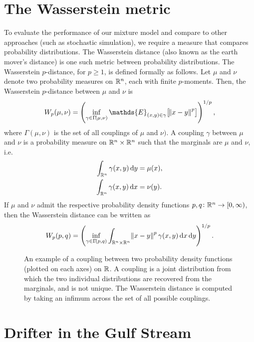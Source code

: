 \section{The Wasserstein metric}
To evaluate the performance of our mixture model and compare to other approaches (such as stochastic simulation), we require a measure that compares probability distributions.
The Wasserstein distance (also known as the earth mover's distance) is one such metric between probability distributions.
The Wasserstein \(p\)-distance, for \(p \geq 1\), is defined formally as follows.
Let \(\mu\) and \(\nu\) denote two probability measures on \(\mathbb{R}^n\), each with finite \(p\)-moments.
Then, the Wasserstein \(p\)-distance between \(\mu\) and \(\nu\) is
\[
	W_p\!\left(\mu, \nu\right) = \left(\inf_{\gamma \in \Gamma\!\left(\mu, \nu\right)}\mathds{E}_{(x,y) \in \gamma}\!\left[\norm{x - y}^p\right]\right)^{1/p},
\]
where \(\Gamma\!(\mu, \nu)\) is the set of all couplings of \(\mu\) and \(\nu)\).
A coupling \(\gamma\) between \(\mu\) and \(\nu\) is a probability measure on \(\mathbb{R}^n \times \mathbb{R}^n\) such that the marginals are \(\mu\) and \(\nu\), i.e.
\begin{align*}
	\int_{\R^n}{\gamma(x,y)\dif y} & = \mu(x), \\
	\int_{\R^n}{\gamma(x,y)\dif x} & = \nu(y).
\end{align*}
If \(\mu\) and \(\nu\) admit the respective probability density functions \(p, q \colon \mathbb{R}^n \to [0,\infty)\), then the Wasserstein distance can be written as
\[
	W_p\!\left(p, q\right) = \left(\inf_{\gamma \in \Gamma\!\left(p,q\right)}\int_{\R^n \times \R^n}{\norm{x - y}^p \gamma\!\left(x,y\right)\dif x\dif y}\right)^{1/p}.
\]



\begin{figure}
	\begin{center}
		\caption{An example of a coupling between two probability density functions (plotted on each axes) on \(\mathbb{R}\).
			A coupling is a joint distribution from which the two individual distributions are recovered from the marginals, and is not unique.
			The Wasserstein distance is computed by taking an infimum across the set of all possible couplings.}
		\label{fig:pdf_coupling}
	\end{center}
\end{figure}



\section{Drifter in the Gulf Stream}\label{sec:appl_ocean}

